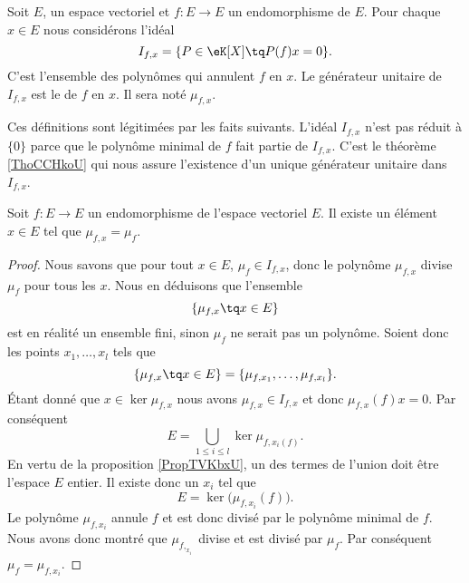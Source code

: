 \begin{definition}  \label{Decyyumy}
    Soit \( E\), un espace vectoriel et \( f\colon E\to E\) un endomorphisme de \( E\). Pour chaque \( x\in E\) nous considérons l'idéal
    \begin{equation}
        I_{f,x}=\{ P\in \eK[X]\tq P(f)x=0 \}.
    \end{equation}
    C'est l'ensemble des polynômes qui annulent \( f\) en \( x\). Le générateur unitaire de \( I_{f,x}\) est le  de \( f\) en \( x\). Il sera noté \( \mu_{f,x}\).
\end{definition}
Ces définitions sont légitimées par les faits suivants. L'idéal \( I_{f,x}\) n'est pas réduit à \( \{ 0 \}\) parce que le polynôme minimal de \( f\) fait partie de \( I_{f,x}\). C'est le théorème \ref{ThoCCHkoU} qui nous assure l'existence d'un unique générateur unitaire dans~\( I_{f,x}\). 

\begin{lemma}\label{LemSYsJJj}
    Soit \( f\colon E\to E\) un endomorphisme de l'espace vectoriel \( E\). Il existe un élément \( x\in E\) tel que \( \mu_{f,x}=\mu_f\).
\end{lemma}

\begin{proof}
    Nous savons que pour tout \( x\in E\), \( \mu_f\in I_{f,x}\), donc le polynôme \( \mu_{f,x}\) divise \( \mu_f\) pour tous les \( x\). Nous en déduisons que l'ensemble
    \begin{equation}
        \{ \mu_{f,x}\tq x\in E \}
    \end{equation}
    est en réalité un ensemble fini, sinon \( \mu_f\) ne serait pas un polynôme. Soient donc les points \( x_1,\ldots, x_l\) tels que
    \begin{equation}
        \{ \mu_{f,x}\tq x\in E \}=\{ \mu_{f,x_1},\ldots, \mu_{f,x_l} \}.
    \end{equation}
    Étant donné que \( x\in \ker\mu_{f,x}\) nous avons \( \mu_{f,x}\in I_{f,x}\) et donc \( \mu_{f,x}(f)x=0\). Par conséquent
    \begin{equation}
        E=\bigcup_{1\leq i\leq l}\ker\mu_{f,x_i(f)}.
    \end{equation}
    En vertu de la proposition \ref{PropTVKbxU}, un des termes de l'union doit être l'espace \( E\) entier. Il existe donc un \( x_i\) tel que
    \begin{equation}
        E=\ker\big( \mu_{f,x_i}(f) \big).
    \end{equation}
    Le polynôme \( \mu_{f,x_i}\) annule \( f\) et est donc divisé par le polynôme minimal de \( f\). Nous avons donc montré que \( \mu_{f,_{x_i}}\) divise et est divisé par \( \mu_f\). Par conséquent \( \mu_f=\mu_{f,x_i}\).
\end{proof}

